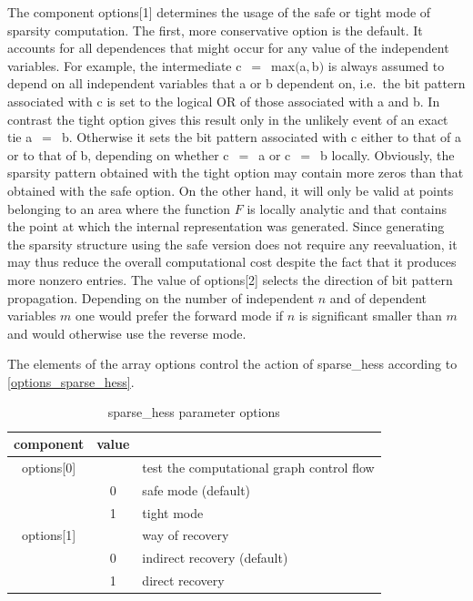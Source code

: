 \documentclass[11pt,twoside]{article}
\begin{document}
The component {\sf options[1]} determines
the usage of the safe or tight mode of sparsity computation.
The first, more conservative option is the default. It accounts for all 
dependences that might occur for any value of the
independent variables. For example, the intermediate 
{\sf c}~$=$~{\sf max}$(${\sf a}$,${\sf b}$)$ is
always assumed to depend on all independent variables that {\sf a} or {\sf b}
dependent on, i.e.\ the bit pattern associated with {\sf c} is set to the
logical {\sf OR} of those associated with {\sf a} and {\sf b}. 
In contrast
the tight option gives this result only in the unlikely event of an exact
tie {\sf a}~$=$~{\sf b}. Otherwise it sets the bit pattern
associated with {\sf c} either to that of {\sf a} or to that of {\sf b},
depending on whether {\sf c}~$=$~{\sf a} or {\sf c}~$=$~{\sf b} locally.
Obviously, the sparsity pattern obtained with the tight option may contain
more zeros than that obtained with the safe option. On the other hand, it
will only be valid at points belonging to an area where the function $F$ is locally
analytic and that contains the point at which the internal representation was
generated. Since generating the sparsity structure using the safe version does not
require any reevaluation, it may thus reduce the overall computational cost 
despite the fact that it produces more nonzero entries. 
The value of {\sf options[2]} selects the direction of bit pattern propagation.
Depending on the number of independent $n$ and of dependent variables $m$ 
one would prefer the forward mode if $n$ is significant smaller than $m$ and
would otherwise use the reverse mode.

 The elements of the array {\sf options} control the action of 
{\sf sparse\_hess} according to \autoref{options_sparse_hess}.
\begin{table}[h]
\center
\begin{tabular}{|c|c|l|} \hline
component & value &  \\ \hline
{\sf options[0]} &    &  test the computational graph control flow \\
                 & 0  &  safe mode (default) \\
                 & 1  &  tight mode \\ \hline
{\sf options[1]} &    &  way of recovery \\
                 & 0  &  indirect recovery (default) \\
                 & 1  &  direct recovery \\ \hline
\end{tabular}
\caption{ {\sf sparse\_hess} parameter {\sf options}\label{options_sparse_hess}}
\end{table}           
\end{document}
